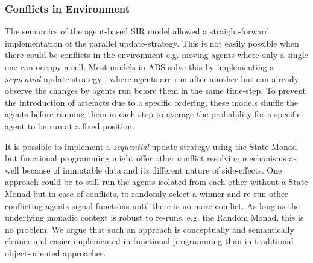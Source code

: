 \subsubsection{Conflicts in Environment}
The semantics of the agent-based SIR model allowed a straight-forward implementation of the parallel update-strategy. This is not easily possible when there could be conflicts in the environment e.g. moving agents where only a single one can occupy a cell. Most models in ABS \cite{epstein_growing_1996} solve this by implementing a \textit{sequential} update-strategy \cite{thaler_art_2017}, where agents are run after another but can already observe the changes by agents run before them in the same time-step. To prevent the introduction of artefacts due to a specific ordering, these models shuffle the agents before running them in each step to average the probability for a specific agent to be run at a fixed position.

It is possible to implement a \textit{sequential} update-strategy using the State Monad but functional programming might offer other conflict resolving mechanisms as well because of immutable data and its different nature of side-effects. One approach could be to still run the agents isolated from each other without a State Monad but in case of conflicts, to randomly select a winner and re-run other conflicting agents signal functions until there is no more conflict. As long as the underlying monadic context is robust to re-runs, e.g. the Random Monad, this is no problem. We argue that such an approach is conceptually and semantically cleaner and easier implemented in functional programming than in traditional object-oriented approaches.